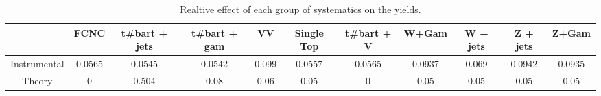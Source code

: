 \begin{table}[htbp]
\begin{center}
\begin{tabular}{|c|c|c|c|c|c|c|c|c|c|c|}
\hline 
      & FCNC      & t#bar{t} + jets      & t#bar{t} +  gam      & VV      & Single Top      & t#bar{t} + V      & W+Gam      & W + jets      & Z + jets      & Z+Gam \\ 
\hline 
 Instrumental & 0.0565 & 0.0545 & 0.0542 & 0.099 & 0.0557 & 0.0565 & 0.0937 & 0.069 & 0.0942 & 0.0935 \\ 
 Theory & 0 & 0.504 & 0.08 & 0.06 & 0.05 & 0 & 0.05 & 0.05 & 0.05 & 0.05 \\ 
\hline 
\end{tabular} 
\caption{Realtive effect of each group of systematics on the yields.} 
\end{center} 
\end{table} 
